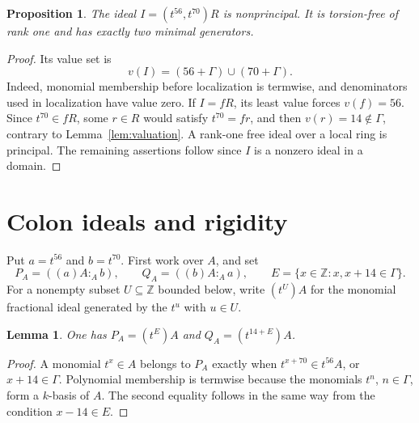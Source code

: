 \documentclass[11pt,letterpaper]{article}
\newtheorem{proposition}[theorem]{Proposition}
\newtheorem{lemma}[theorem]{Lemma}
\theoremstyle{remark}
\newcommand{\ZZ}{\mathbb Z}
\numberwithin{equation}{section}
\begin{document}
\begin{proposition}\label{prop:nonprincipal}
The ideal $I=(t^{56},t^{70})R$ is nonprincipal. It is torsion-free of rank one and has exactly two minimal generators.
\end{proposition}
\begin{proof}
Its value set is
\[
 v(I)=(56+\Gamma)\cup(70+\Gamma).
\]
Indeed, monomial membership before localization is termwise, and denominators used in localization have value zero. If $I=fR$, its least value forces $v(f)=56$. Since $t^{70}\in fR$, some $r\in R$ would satisfy $t^{70}=fr$, and then $v(r)=14\notin\Gamma$, contrary to Lemma~\ref{lem:valuation}. A rank-one free ideal over a local ring is principal. The remaining assertions follow since $I$ is a nonzero ideal in a domain.
\end{proof}

\section{Colon ideals and rigidity}\label{sec:colon}
Put $a=t^{56}$ and $b=t^{70}$. First work over $A$, and set
\[
 P_A=((a)A:_A b),\qquad Q_A=((b)A:_A a),\qquad
 E=\{x\in\ZZ:x,x+14\in\Gamma\}.
\]
For a nonempty subset $U\subseteq\ZZ$ bounded below, write $(t^U)A$ for the monomial fractional ideal generated by the $t^u$ with $u\in U$.

\begin{lemma}\label{lem:colons}
One has $P_A=(t^E)A$ and $Q_A=(t^{14+E})A$.
\end{lemma}
\begin{proof}
A monomial $t^x\in A$ belongs to $P_A$ exactly when $t^{x+70}\in t^{56}A$, or $x+14\in\Gamma$. Polynomial membership is termwise because the monomials $t^n$, $n\in\Gamma$, form a $k$-basis of $A$. The second equality follows in the same way from the condition $x-14\in E$.
\end{proof}
\end{document}
